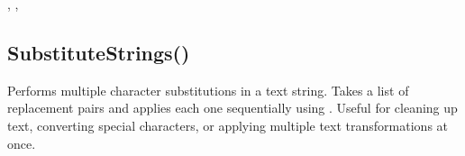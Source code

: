 \documentclass[letterpaper,10pt,english]{sphinxmanual}
\begin{document}
\sphinxAtStartPar
{}

\sphinxAtStartPar
{}, , 

\ignorespaces 

\subsection{SubstituteStrings()}
\label{\detokenize{reference/utility:substitutestrings}}\label{\detokenize{reference/utility:index-54}}
\sphinxAtStartPar
{}

\sphinxAtStartPar
{}

\sphinxAtStartPar
Performs multiple character substitutions in a text string. Takes a list of replacement pairs and applies each one sequentially using . Useful for cleaning up text, converting special characters, or applying multiple text transformations at once.

\sphinxAtStartPar
{}

\begin{sphinxVerbatim}[commandchars=\\\{\}]
\end{sphinxVerbatim}

\sphinxAtStartPar
{}
\end{document}
